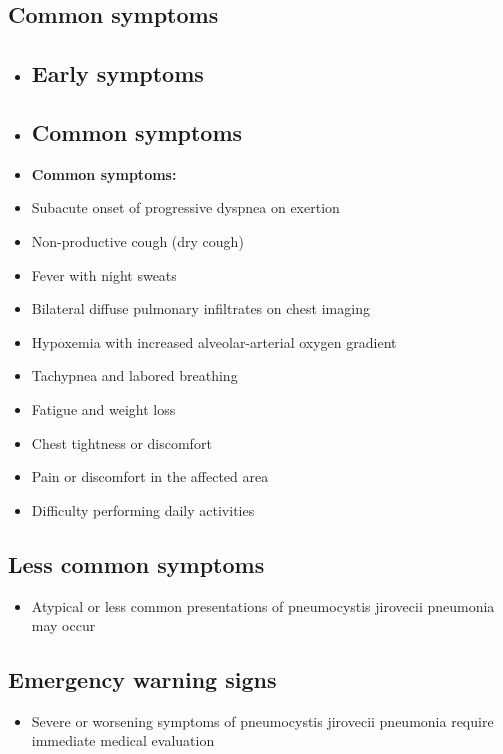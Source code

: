 \subsection{Common symptoms}
\begin{itemize}[noitemsep]
  \item \subsection{Early symptoms}
  \item \subsection{Common symptoms}
  \item \textbf{Common symptoms:}
  \item Subacute onset of progressive dyspnea on exertion
  \item Non-productive cough (dry cough)
  \item Fever with night sweats
  \item Bilateral diffuse pulmonary infiltrates on chest imaging
  \item Hypoxemia with increased alveolar-arterial oxygen gradient
  \item Tachypnea and labored breathing
  \item Fatigue and weight loss
  \item Chest tightness or discomfort
  \item Pain or discomfort in the affected area
  \item Difficulty performing daily activities
\end{itemize}

\subsection{Less common symptoms}
\begin{itemize}[noitemsep]
  \item Atypical or less common presentations of pneumocystis jirovecii pneumonia may occur
\end{itemize}

\subsection{Emergency warning signs}
\begin{itemize}[noitemsep]
  \item Severe or worsening symptoms of pneumocystis jirovecii pneumonia require immediate medical evaluation
\end{itemize}
